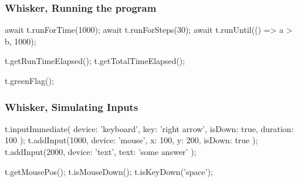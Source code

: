 \begin{frame}[fragile]\frametitle{Whisker, Running the program}
    \vspace{-\bigskipamount}
    \begin{minipage}{.7\textwidth}\end{minipage}%
    \hspace{-.4\textwidth}%
    \begin{minipage}{.6\textwidth}
        \begin{javascriptcode}
            await t.runForTime(1000);
            await t.runForSteps(30);
            await t.runUntil(() => a > b, 1000);

            t.getRunTimeElapsed();
            t.getTotalTimeElapsed();

            t.greenFlag();
        \end{javascriptcode}
    \end{minipage}
\end{frame}

\begin{frame}[fragile]\frametitle{Whisker, Simulating Inputs}
    \begin{javascriptcode}
        t.inputImmediate({
            device: 'keyboard',
            key: 'right arrow',
            isDown: true,
            duration: 100
        });
        t.addInput(1000, {
            device: 'mouse',
            x: 100,
            y: 200,
            isDown: true
        });
        t.addInput(2000, {
            device: 'text',
            text: 'some answer'
        });

        t.getMousePos();
        t.isMouseDown();
        t.isKeyDown('space');
    \end{javascriptcode}
\end{frame}

